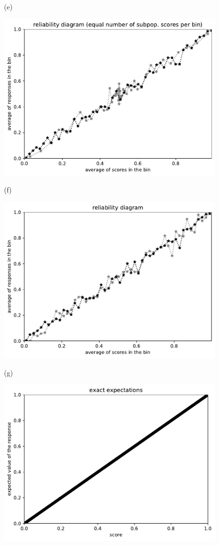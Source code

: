 \documentclass{article}
\newlength{\vertsep}
\newlength{\imsize}
\begin{document}
\begin{figure}
\begin{centering}
(e)
\parbox{\imsize}{\includegraphics[width=\imsize]
{../codes/unweighted/10000_7000_50_3/equisamps.pdf}}
\quad\quad
(f)
\parbox{\imsize}{\includegraphics[width=\imsize]
{../codes/unweighted/10000_7000_50_3/equiscore.pdf}}

\vspace{\vertsep}

(g)
\parbox{\imsize}{\includegraphics[width=\imsize]
{../codes/unweighted/10000_7000_10_3/exact.pdf}}


\end{centering}
\end{figure}
\end{document}
